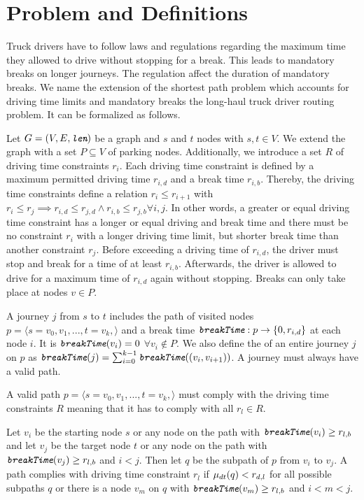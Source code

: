 \chapter{Problem and Definitions}\label{chapter:problem_definitions}
Truck drivers have to follow laws and regulations regarding the maximum time they allowed to drive without stopping for a break. This leads to mandatory breaks on longer journeys. The regulation affect the duration of mandatory breaks. We name the extension of the shortest path problem which accounts for driving time limits and mandatory breaks the long-haul truck driver routing problem. It can be formalized as follows.

Let $G=(V,E,\texttt{\itshape len})$ be a graph and $s$ and $t$ nodes with $s,t \in V$. We extend the graph with a set $P \subseteq V$ of parking nodes. Additionally, we introduce a set $R$ of driving time constraints $r_i$. Each driving time constraint is defined by a maximum permitted driving time $r_{i,d}$ and a break time $r_{i,b}$. Thereby, the driving time constraints define a relation $r_i \le r_{i+1}$ with $r_i \le r_j \implies r_{i,d} \le r_{j,d} \land  r_{i,b} \le r_{j,b} \forall i,j$. In other words, a greater or equal driving time constraint has a longer or equal driving and break time and there must be no constraint $r_i$ with a longer driving time limit, but shorter break time than another constraint $r_j$. Before exceeding a driving time of $r_{i,d}$, the driver must stop and break for a time of at least $r_{i,b}$. Afterwards, the driver is allowed to drive for a maximum time of $r_{i,d}$ again without stopping. Breaks can only take place at nodes $v \in P$.

A journey $j$ from $s$ to $t$ includes the path of visited nodes $p = \langle s=v_0,v_1,...,t=v_k, \rangle$ and a break time $\texttt{\itshape breakTime}: p \rightarrow \{0,r_{i,d}\}$ at each node $i$. It is $\texttt{\itshape breakTime}(v_i) = 0$ $\forall v_i \notin P$. We also define the  of an entire journey $j$ on $p$ as $\texttt{\itshape breakTime}(j) = \sum_{i=0}^{k-1}{\texttt{\itshape breakTime}((v_i,v_{i+1}))}$. A journey must always have a valid path.

\begin{definition}
	A valid path $p = \langle s=v_0,v_1,...,t=v_k, \rangle$ must comply with the driving time constraints $R$ meaning that it has to comply with all $r_l \in R$.

	Let $v_i$ be the starting node $s$ or any node on the path with $\texttt{\itshape breakTime}(v_i) \ge r_{l,b}$ and let $v_j$ be the target node $t$ or any node on the path with $\texttt{\itshape breakTime}(v_j) \ge r_{l,b}$ and $i < j$. Then let $q$ be the subpath of $p$ from $v_i$ to $v_j$. A path complies with driving time constraint $r_l$ if $\mu_{dt}(q) < r_{d,l}$ for all possible subpaths $q$ or there is a node $v_m$ on $q$ with $\texttt{\itshape breakTime}(v_m) \ge r_{l,b}$ and $i < m < j$.
\end{definition}

